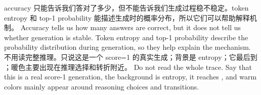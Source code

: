 {}\markdownRendererInterblockSeparator
{}\markdownRendererInterblockSeparator
{}accuracy 只能告诉我们答对了多少，但不能告诉我们生成过程稳不稳定。token entropy 和 top-1 probability 能描述生成时的概率分布，所以它们可以帮助解释机制。\markdownRendererInterblockSeparator
{}\markdownRendererInterblockSeparator
{}Accuracy tells us how many answers are correct, but it does not tell us whether generation is stable. Token entropy and top-1 probability describe the probability distribution during generation, so they help explain the mechanism.\markdownRendererInterblockSeparator
{}\markdownRendererInterblockSeparator
{}\markdownRendererInterblockSeparator
{}不用读完整推理。只说这是一个 score=1 的真实生成；背景是 entropy；它最后到 ；暖色主要出现在推理选择和转折附近。\markdownRendererInterblockSeparator
{}\markdownRendererInterblockSeparator
{}Do not read the whole trace. Say that this is a real score-1 generation, the background is entropy, it reaches , and warm colors mainly appear around reasoning choices and transitions.\markdownRendererDocumentEnd